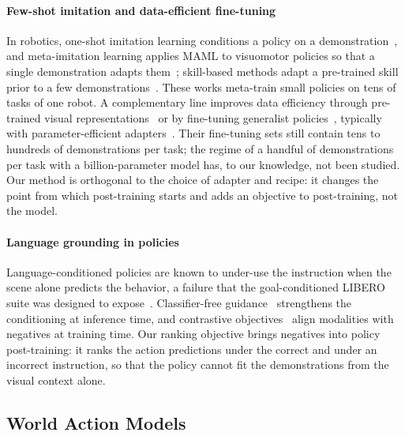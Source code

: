 \paragraph{Few-shot imitation and data-efficient fine-tuning}
In robotics, one-shot imitation learning conditions a policy on a demonstration~\cite{duan2017oneshot,jang2022bcz}, and meta-imitation learning applies MAML to visuomotor policies so that a single demonstration adapts them~\cite{finn2017mil,yu2018daml}; skill-based methods adapt a pre-trained skill prior to a few demonstrations~\cite{hakhamaneshi2022fist}.
These works meta-train small policies on tens of tasks of one robot.
A complementary line improves data efficiency through pre-trained visual representations~\cite{nair2022r3m,majumdar2023vc1} or by fine-tuning generalist policies~\cite{octo2024,kim2024openvla,black2024pi0,intelligence2025pi05,shukor2025smolvla}, typically with parameter-efficient adapters~\cite{hu2022lora,kim2025oft}.
Their fine-tuning sets still contain tens to hundreds of demonstrations per task; the regime of a handful of demonstrations per task with a billion-parameter model has, to our knowledge, not been studied.
Our method is orthogonal to the choice of adapter and recipe: it changes the point from which post-training starts and adds an objective to post-training, not the model.

\paragraph{Language grounding in policies}
Language-conditioned policies are known to under-use the instruction when the scene alone predicts the behavior, a failure that the goal-conditioned LIBERO suite was designed to expose~\cite{liu2023libero}.
Classifier-free guidance~\cite{ho2022cfg} strengthens the conditioning at inference time, and contrastive objectives~\cite{radford2021clip} align modalities with negatives at training time.
Our ranking objective brings negatives into policy post-training: it ranks the action predictions under the correct and under an incorrect instruction, so that the policy cannot fit the demonstrations from the visual context alone.

\subsection{World Action Models}
\label{sec:related_wam}

